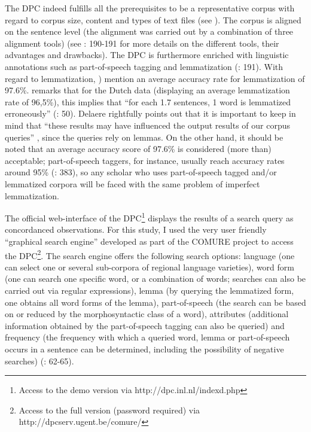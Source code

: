 The DPC indeed fulfills all the prerequisites to be a representative corpus with regard to corpus size, content and types of text files (see ). The corpus is aligned on the sentence level (the alignment was carried out by a combination of three alignment tools) (see \citealt{spyns_dutch_2013}: 190-191 for more details on the different tools, their advantages and drawbacks). The DPC is furthermore enriched with linguistic annotations such as part-of-speech tagging and lemmatization (\citealt{spyns_dutch_2013}: 191). With regard to lemmatization, \citet[384]{macken_dutch_2011}) mention an average accuracy rate for lemmatization of 97.6\%. \citet[50]{delaere_translations_2015} remarks that for the Dutch data (displaying an average lemmatization rate of 96,5\%), this implies that “for each 1.7 sentences, 1 word is lemmatized erroneously” (\citealt{delaere_translations_2015}: 50). Delaere rightfully points out that it is important to keep in mind that “these results may have influenced the output results of our corpus queries” \citep[50]{delaere_translations_2015}, since the queries rely on lemmas. On the other hand, it should be noted that an average accuracy score of 97.6\% is considered (more than) acceptable; part-of-speech taggers, for instance, usually reach accuracy rates around 95\% (\citealt{macken_dutch_2011}: 383), so any scholar who uses part-of-speech tagged and/or lemmatized corpora will be faced with the same problem of imperfect lemmatization.



The official web-interface of the DPC\footnote{Access to the demo version via http://dpc.inl.nl/indexd.php} displays the results of a search query as concordanced observations. For this study, I used the very user friendly “graphical search engine” developed as part of the COMURE project to access the DPC\footnote{Access to the full version (password required) via http://dpcserv.ugent.be/comure/}. The search engine offers the following search options: language (one can select one or several sub-corpora of regional language varieties), word form (one can search one specific word, or a combination of words; searches can also be carried out via regular expressions), lemma (by querying the lemmatized form, one obtains all word forms of the lemma), part-of-speech (the search can be based on or reduced by the morphosyntactic class of a word), attributes (additional information obtained by the part-of-speech tagging can also be queried) and frequency (the frequency with which a queried word, lemma or part-of-speech occurs in a sentence can be determined, including the possibility of negative searches) (\citealt{delaere_translations_2015}: 62-65).




